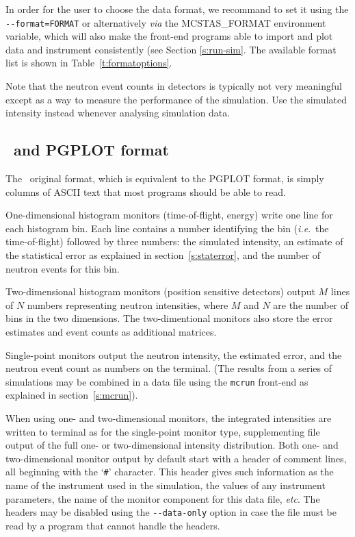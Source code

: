 In order for the user to choose the data format, we recommand to set it using the \verb+--format=FORMAT+ or alternatively {\it via} the MCSTAS\_FORMAT environment variable, which will also make the front-end programs able to import and plot data and instrument consistently (see Section \ref{s:run-sim}. The available format list is shown in Table~\ref{t:formatoptions}. 

Note that the neutron event counts in detectors is typically not very
meaningful except as a way to measure the performance of the
simulation. Use the simulated intensity instead whenever analysing
simulation data.

\subsection{\MCS\ and PGPLOT format}
 
The \MCS\ original format, which is equivalent to the PGPLOT format, is simply columns of ASCII text that most programs should
be able to read.

One-dimensional histogram monitors (time-of-flight, energy)
write one line for each histogram bin. Each line contains a number
identifying the bin (\textit{i.e}.\ the time-of-flight) followed by
three numbers: the simulated intensity, an estimate of the statistical
error as explained in section~\ref{s:staterror}, and the number of
neutron events for this bin.

Two-dimensional histogram monitors (position sensitive detectors)
output $M$ lines of $N$ numbers representing neutron intensities, where
$M$ and $N$ are the number of bins in the two dimensions. The
two-dimentional monitors also store the error estimates and event counts as additional matrices.

Single-point monitors output the neutron intensity, the estimated
error, and the neutron event count as numbers on the
terminal. (The results from a series of simulations may be combined in a
data file using the \verb+mcrun+ front-end as explained in
section~\ref{s:mcrun}).

When using one- and two-dimensional monitors, the integrated
intensities are written to terminal as for the single-point monitor
type, supplementing file output of the full one- or two-dimensional
intensity distribution. Both one- and two-dimensional monitor output by default start with a
header of comment lines, all beginning with the `\verb+#+' character.
This header gives such information as the name of the instrument used in
the simulation, the values of any instrument parameters, the name of the
monitor component for this data file, \textit{etc}. The headers may be
disabled using the \verb+--data-only+ option in case the file must be
read by a program that cannot handle the headers.


